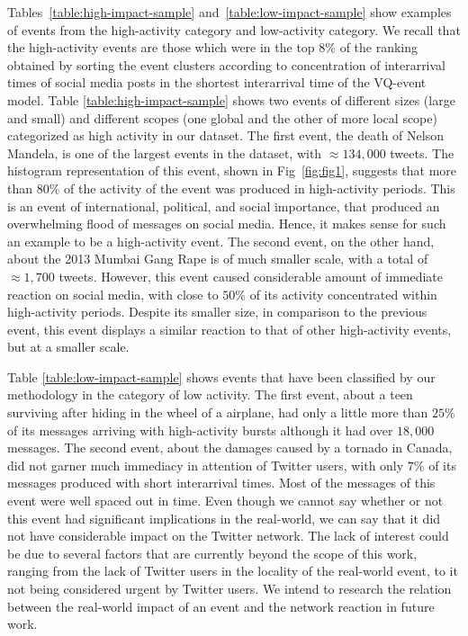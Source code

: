 Tables~\ref{table:high-impact-sample}
and~\ref{table:low-impact-sample} show examples of events from the
high-activity category and low-activity category. We recall that the
high-activity events are those which were in the top 8\% of the
ranking obtained by sorting the event clusters according to
concentration of interarrival times of social media posts in the
shortest interarrival time of the VQ-event model.  Table
\ref{table:high-impact-sample} shows two events of different sizes
(large and small) and different scopes (one global and the other of
more local scope) categorized as high activity in our dataset. The
first event, the death of Nelson Mandela, is one of the largest events
in the dataset, with $\approx 134,000$ tweets. The histogram
representation of this event, shown in Fig~\ref{fig:fig1}, suggests
that more than $80\%$ of the activity of the event was produced in
high-activity periods.  This is an event of international, political,
and social importance, that produced an overwhelming flood of messages
on social media. %
Hence, it makes
sense for such an example to be a high-activity event.  The second
event, on the other hand, about the 2013 Mumbai Gang Rape is of much
smaller scale, with a total of $\approx 1,700$ tweets.  However, this
event caused considerable amount of immediate reaction on social
media, with close to $50\%$ of its activity concentrated within
high-activity periods. Despite its smaller size, in comparison to the
previous event, this event displays a similar reaction to that of
other high-activity events, but at a smaller scale. 

Table \ref{table:low-impact-sample} shows events that have been
classified by our methodology in the category of low activity.  The
first event, about a teen surviving after hiding in the wheel of a
airplane, had only a little more than $25\%$ of its messages arriving
with high-activity bursts although it had over $18,000$ messages.  The
second event, about the damages caused by a tornado in Canada, did not
garner much immediacy in attention of Twitter users, with only $7\%$
of its messages produced with short interarrival times. Most of the
messages of this event were well spaced out in time. Even though we
cannot say whether or not this event had significant implications in
the real-world, we can say that it did not have considerable impact on
the Twitter network. The lack of interest could be due to several
factors that are currently beyond the scope of this work, ranging from
the lack of Twitter users in the locality of the real-world event, to
it not being considered urgent by Twitter users. We intend to research
the relation between the real-world impact of an event and the network
reaction in future work.



